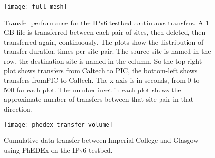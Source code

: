 \begin{figure}[htp]
\centering
\texttt{[image: full-mesh]}
\caption{Transfer performance for the IPv6 testbed continuous transfers. A 1 GB file is transferred between each pair of sites, then deleted, then transferred again, continuously. The plots show the distribution of transfer duration times per site pair. The source site is named in the row, the destination site is named in the column. So the top-right plot shows transfers from Caltech to PIC, the bottom-left shows transfers fromPIC to Caltech. The x-axis is in seconds, from 0 to 500 for each plot. The number inset in each plot shows the approximate number of transfers between that site pair in that direction.}\label{fig:full-mesh}
\end{figure}

\begin{figure}[htp]
\centering
\texttt{[image: phedex-transfer-volume]}
\caption{Cumulative data-transfer between Imperial College and Glasgow using PhEDEx on the IPv6 testbed.}\label{fig:phedex-transfer-volume}
\end{figure}

